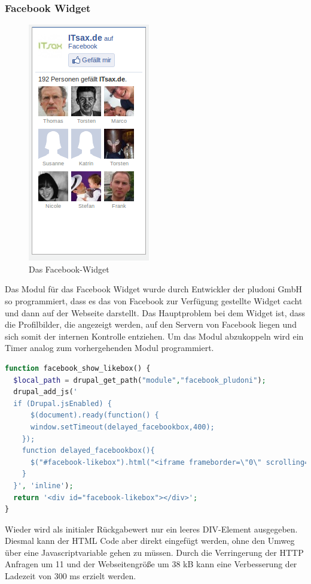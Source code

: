 \subsubsection{Facebook Widget}
\begin{figure}[!ht]
  \centering
  \includegraphics[scale=0.5]{material/facebook_widget.png}
  \caption{Das Facebook-Widget}
  \label{fig:facebookwidget}
\end{figure} Das Modul für das Facebook Widget wurde durch Entwickler der pludoni GmbH so programmiert, dass es das von Facebook zur Verfügung gestellte Widget cacht und dann auf der Webseite darstellt. Das Hauptproblem bei dem Widget ist, dass die Profilbilder, die angezeigt werden, auf den Servern von Facebook liegen und sich somit der internen Kontrolle entziehen. Um das Modul abzukoppeln wird ein Timer analog zum vorhergehenden Modul programmiert. 

\begin{minipage}[t]{1\textwidth}
\begin{lstlisting}[language=php,label=Facebook Widget,caption=Facebook Widget]
function facebook_show_likebox() {
  $local_path = drupal_get_path("module","facebook_pludoni");
  drupal_add_js('
  if (Drupal.jsEnabled) {
      $(document).ready(function() {
      window.setTimeout(delayed_facebookbox,400);
    });
    function delayed_facebookbox(){
      $("#facebook-likebox").html("<iframe frameborder=\"0\" scrolling=\"no\" src=\"/'.$local_path.'/caching/likebox_cache.html\" id=\"fbooklikebox\"></iframe>");
    }
  }', 'inline');
  return '<div id="facebook-likebox"></div>';
}
\end{lstlisting}
\end{minipage}
Wieder wird als initialer Rückgabewert nur ein leeres DIV-Element ausgegeben. Diesmal kann der HTML Code aber direkt eingefügt werden, ohne den Umweg über eine Javascriptvariable gehen zu müssen. Durch die Verringerung der HTTP Anfragen um 11 und der Webseitengröße um 38 kB kann eine Verbesserung der Ladezeit von 300 ms erzielt werden. 

